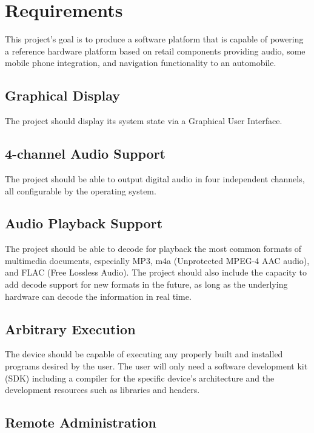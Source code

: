 \section{Requirements}

This project's goal is to produce a software platform that is capable of powering a reference hardware platform based on retail components providing audio, some mobile phone integration, and navigation functionality to an automobile.

\subsection{Graphical Display}

The project should display its system state via a Graphical User Interface.

\subsection{4-channel Audio Support}

The project should be able to output digital audio in four independent channels, all configurable by the operating system.

\subsection{Audio Playback Support}

The project should be able to decode for playback the most common formats of multimedia documents, especially MP3, m4a (Unprotected MPEG-4 AAC audio), and FLAC (Free Lossless Audio).
The project should also include the capacity to add decode support for new formats in the future, as long as the underlying hardware can decode the information in real time.

\subsection{Arbitrary Execution}

The device should be capable of executing any properly built and installed programs desired by the user.
The user will only need a software development kit (SDK) including a compiler for the specific device's architecture and the development resources such as libraries and headers.

\subsection{Remote Administration}

